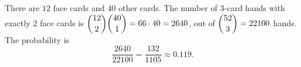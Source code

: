 There are $12$ face cards and $40$ other cards. The number of $3$-card hands with exactly $2$ face cards is $\dbinom{12}{2}\dbinom{40}{1}=66\cdot40=2640$, out of $\dbinom{52}{3}=22100$ hands. The probability is
\[
\dfrac{2640}{22100}=\boxed{\dfrac{132}{1105}}\approx0.119 .
\]

